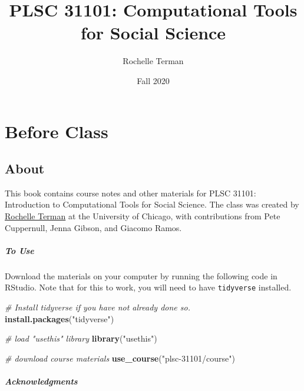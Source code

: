 \documentclass[]{book}
\title{PLSC 31101: Computational Tools for Social Science}
\author{Rochelle Terman}
\date{Fall 2020}
\newenvironment{Shaded}{\begin{snugshade}}{\end{snugshade}}
\newcommand{\KeywordTok}[1]{\textcolor[rgb]{0.13,0.29,0.53}{\textbf{#1}}}
\newcommand{\StringTok}[1]{\textcolor[rgb]{0.31,0.60,0.02}{#1}}
\newcommand{\CommentTok}[1]{\textcolor[rgb]{0.56,0.35,0.01}{\textit{#1}}}
\newcommand{\NormalTok}[1]{#1}
\begin{document}
\maketitle

{
\setcounter{tocdepth}{1}
\tableofcontents
}
\part{Before Class}\label{part-before-class}

\chapter{About}\label{about}

This book contains course notes and other materials for PLSC 31101:
Introduction to Computational Tools for Social Science. The class was
created by \href{http://rochelleterman.com/}{Rochelle Terman} at the
University of Chicago, with contributions from Pete Cuppernull, Jenna
Gibson, and Giacomo Ramos.

\subsubsection*{To Use}\label{to-use}

Download the materials on your computer by running the following code in
RStudio. Note that for this to work, you will need to have
\texttt{tidyverse} installed.

\begin{Shaded}
\begin{Highlighting}[]
\CommentTok{# Install tidyverse if you have not already done so.}
\KeywordTok{install.packages}\NormalTok{(}\StringTok{"tidyverse"}\NormalTok{)}

\CommentTok{# load "usethis" library}
\KeywordTok{library}\NormalTok{(}\StringTok{"usethis"}\NormalTok{)}

\CommentTok{# download course materials}
\KeywordTok{use_course}\NormalTok{(}\StringTok{"plsc-31101/course"}\NormalTok{)}
\end{Highlighting}
\end{Shaded}

\subsubsection*{Acknowledgments}\label{acknowledgments}
\end{document}
